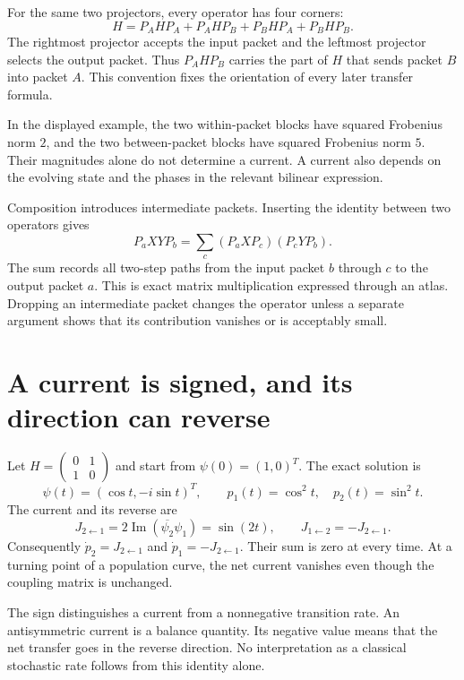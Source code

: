 For the same two projectors, every operator has four corners:
\[
H=P_AHP_A+P_AHP_B+P_BHP_A+P_BHP_B.
\]
The rightmost projector accepts the input packet and the leftmost projector selects the output packet. Thus $P_AHP_B$ carries the part of $H$ that sends packet $B$ into packet $A$. This convention fixes the orientation of every later transfer formula.

In the displayed example, the two within-packet blocks have squared Frobenius norm $2$, and the two between-packet blocks have squared Frobenius norm $5$. Their magnitudes alone do not determine a current. A current also depends on the evolving state and the phases in the relevant bilinear expression.

Composition introduces intermediate packets. Inserting the identity between two operators gives
\[
P_aXY P_b=\sum_c(P_aXP_c)(P_cYP_b).
\]
The sum records all two-step paths from the input packet $b$ through $c$ to the output packet $a$. This is exact matrix multiplication expressed through an atlas. Dropping an intermediate packet changes the operator unless a separate argument shows that its contribution vanishes or is acceptably small.



\clearpage
\section{A current is signed, and its direction can reverse}

Let $H=\left(\begin{smallmatrix}0&1\\1&0\end{smallmatrix}\right)$ and start from $\psi(0)=(1,0)^T$. The exact solution is
\[
\psi(t)=(\cos t,-i\sin t)^T,\qquad
p_1(t)=\cos^2t,\quad p_2(t)=\sin^2t.
\]
The current and its reverse are
\[
J_{2\leftarrow1}=2\operatorname{Im}(\overline{\psi_2}\psi_1)
=\sin(2t),\qquad J_{1\leftarrow2}=-J_{2\leftarrow1}.
\]
Consequently $\dot p_2=J_{2\leftarrow1}$ and $\dot p_1=-J_{2\leftarrow1}$. Their sum is zero at every time. At a turning point of a population curve, the net current vanishes even though the coupling matrix is unchanged.

The sign distinguishes a current from a nonnegative transition rate. An antisymmetric current is a balance quantity. Its negative value means that the net transfer goes in the reverse direction. No interpretation as a classical stochastic rate follows from this identity alone.

